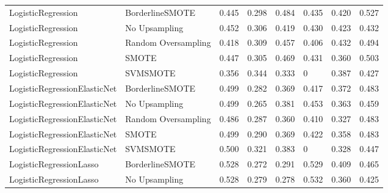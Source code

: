 \begin{tabular}{llllllll}
          LogisticRegression &     BorderlineSMOTE & 0.445 &                     0.298 &                 0.484 &                  0.435 &                                   0.420 &    0.527 \\
          LogisticRegression &       No Upsampling & 0.452 &                     0.306 &                 0.419 &                  0.430 &                                   0.423 &    0.432 \\
          LogisticRegression & Random Oversampling & 0.418 &                     0.309 &                 0.457 &                  0.406 &                                   0.432 &    0.494 \\
          LogisticRegression &               SMOTE & 0.447 &                     0.305 &                 0.469 &                  0.431 &                                   0.360 &    0.503 \\
          LogisticRegression &            SVMSMOTE & 0.356 &                     0.344 &                 0.333 &                      0 &                                   0.387 &    0.427 \\
LogisticRegressionElasticNet &     BorderlineSMOTE & 0.499 &                     0.282 &                 0.369 &                  0.417 &                                   0.372 &    0.483 \\
LogisticRegressionElasticNet &       No Upsampling & 0.499 &                     0.265 &                 0.381 &                  0.453 &                                   0.363 &    0.459 \\
LogisticRegressionElasticNet & Random Oversampling & 0.486 &                     0.287 &                 0.360 &                  0.410 &                                   0.327 &    0.483 \\
LogisticRegressionElasticNet &               SMOTE & 0.499 &                     0.290 &                 0.369 &                  0.422 &                                   0.358 &    0.483 \\
LogisticRegressionElasticNet &            SVMSMOTE & 0.500 &                     0.321 &                 0.383 &                      0 &                                   0.328 &    0.447 \\
     LogisticRegressionLasso &     BorderlineSMOTE & 0.528 &                     0.272 &                 0.291 &                  0.529 &                                   0.409 &    0.465 \\
     LogisticRegressionLasso &       No Upsampling & 0.528 &                     0.279 &                 0.278 &                  0.532 &                                   0.360 &    0.425 \\

\end{tabular}
